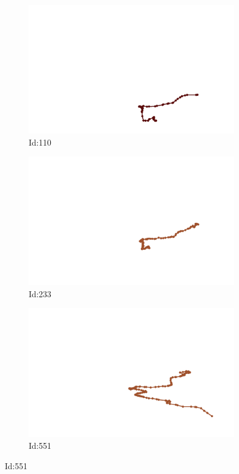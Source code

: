 \documentclass[12pt,twoside]{report}
\begin{document}
\begin{figure}
\centering
\begin{subfigure}[b]{0.20\textwidth}
\centering
\includegraphics[width=\textwidth]{../../trajectories/110.png}
\caption{Id:110}
\end{subfigure}
\begin{subfigure}[b]{0.20\textwidth}
\centering
\includegraphics[width=\textwidth]{../../trajectories/233.png}
\caption{Id:233}
\end{subfigure}
\begin{subfigure}[b]{0.20\textwidth}
\centering
\includegraphics[width=\textwidth]{../../trajectories/551.png}
\caption{Id:551}
\end{subfigure}
\end{figure}
\end{document}
